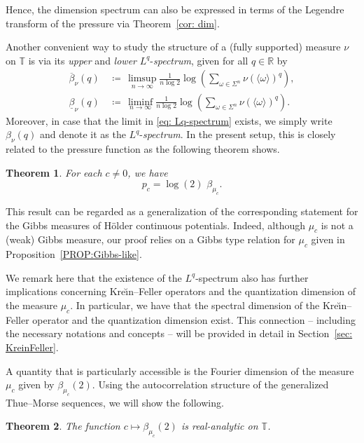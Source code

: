 \documentclass[11pt,reqno]{amsart}
\theoremstyle{plain}
\newtheorem{theorem}{Theorem}[section]
\theoremstyle{definition}
\newcommand{\R}{{\mathbb R}}
\newcommand{\T}{{\mathbb T}}
\newcommand{\ts}{\hspace{0.5pt}}
\newcommand{\TT}{\mathbb{T}}
\begin{document}
Hence, the dimension spectrum can also be expressed in terms of the Legendre transform of the pressure via Theorem~\ref{cor: dim}.

Another convenient way to study the structure of a (fully supported) measure $\nu$ on $\TT$ is via its \emph{upper} and \emph{lower} $L^q$-\emph{spectrum}, given for all $q \in \R$ by
\begin{align}
 \overline{\beta}_{\nu}(q)\, &\coloneqq\,  \limsup_{n\to\infty} \frac{1}{n\log 2} \log \left(\sum_{\omega\in\Sigma^n} {\nu}(\langle \omega \rangle)^q\right),\label{eq: Lq-spectrum}\\
\underline{\beta}_{\nu}(q)\, &\coloneqq\, \liminf_{n\to\infty} \frac{1}{n\log 2} \log \left(\sum_{\omega\in\Sigma^n} {\nu}(\langle \omega \rangle)^q\right).\nonumber
\end{align}
Moreover, in case that the limit in \eqref{eq: Lq-spectrum} exists, we simply write $\beta_{\nu}(q)$ and denote it as the   $L^q$-\emph{spectrum}.
In the present setup, this is closely related to the pressure function as the following theorem shows. 

\begin{theorem}\label{thm: pressure beta}
For each $c \neq 0$, we have  
\[
p_c = \log (2)\,\, \beta_{\mu_c}.
\]
\end{theorem}

This result can be regarded as a generalization of the corresponding statement for the Gibbs measures of H\"{o}lder continuous potentials. Indeed, although $\mu_c$ is not a (weak) Gibbs measure, our proof relies on a Gibbs type relation for $\mu_c$ given in Proposition~\ref{PROP:Gibbs-like}.

We remark here that the existence of the $L^q$-spectrum also has further implications concerning Kre\u{\i}n--Feller operators and the quantization dimension of the measure $\mu_c$. In particular, we have that the spectral dimension of the Kre\u{\i}n--Feller operator and the quantization dimension exist. 
This connection -- including the necessary notations and  concepts -- will be provided in detail in Section~\ref{sec: KreinFeller}.




A quantity that is particularly accessible is the Fourier dimension of the measure $\mu_c$ given by  $\beta_{\mu_c}(2)$. Using the autocorrelation structure of the generalized Thue{\ts}--Morse sequences, we will show the following.

\begin{theorem}\label{thm: beta(2) analytic}
The function  $c\mapsto \beta_{\mu_c}(2)$ is real-analytic on $\T$.
\end{theorem}
\end{document}
